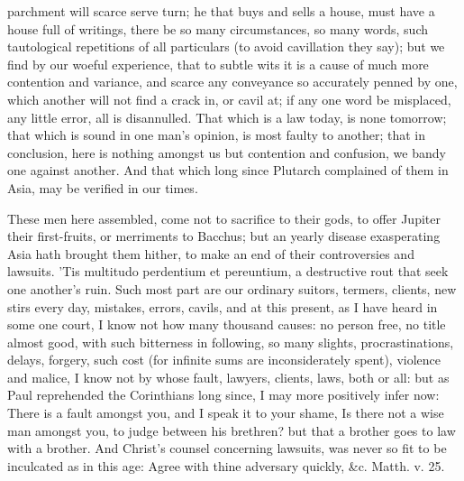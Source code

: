 {parchment will scarce serve turn; he that buys and sells a house, must
have a house full of writings, there be so many circumstances, so many
words, such tautological repetitions of all particulars (to avoid
cavillation they say); but we find by our woeful experience, that to
subtle wits it is a cause of much more contention and variance, and
scarce any conveyance so accurately penned by one, which another will
not find a crack in, or cavil at; if any one word be misplaced, any
little error, all is disannulled. That which is a law today, is none
tomorrow; that which is sound in one man's opinion, is most faulty to
another; that in conclusion, here is nothing amongst us but contention
and confusion, we bandy one against another. And that which long since
Plutarch complained of them in Asia, may be verified in our times.

These men here assembled, come not to sacrifice to their gods, to offer
Jupiter their first-fruits, or merriments to Bacchus; but an yearly
disease exasperating Asia hath brought them hither, to make an end of
their controversies and lawsuits. 'Tis multitudo perdentium et
pereuntium, a destructive rout that seek one another's ruin. Such most
part are our ordinary suitors, termers, clients, new stirs every day,
mistakes, errors, cavils, and at this present, as I have heard in some
one court, I know not how many thousand causes: no person free, no
title almost good, with such bitterness in following, so many slights,
procrastinations, delays, forgery, such cost (for infinite sums are
inconsiderately spent), violence and malice, I know not by whose fault,
lawyers, clients, laws, both or all: but as Paul reprehended the
Corinthians long since, I may more positively infer now: There is
a fault amongst you, and I speak it to your shame, Is there not a
wise man amongst you, to judge between his brethren? but that a
brother goes to law with a brother. And Christ's counsel
concerning lawsuits, was never so fit to be inculcated as in this age:
Agree with thine adversary quickly, \&c. Matth. v. 25.

}
